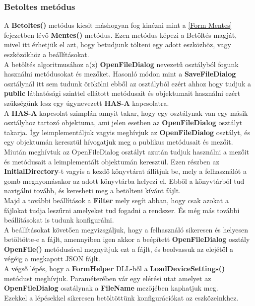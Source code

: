 \documentclass[tocnopagenum]{thesis-ekf}
\theoremstyle{definition}
\theoremstyle{remark}
\begin{document}
	\subsubsection{Betoltes metódus}
	A \textbf{Betoltes()} metódus kicsit máshogyan fog kinézni mint a \ref{Form Mentes} fejezetben lévő \textbf{Mentes()} metódus. Ezen metódus képezi a Betöltés magját, mivel itt érhetjük el azt, hogy betudjunk tölteni egy adott eszközhöz, vagy eszközökhöz a beállításokat. 
	\\
	A betöltés algoritmusához a(z) \textbf{OpenFileDialog} nevezetű osztályból fogunk használni metódusokat és mezőket. Hasonló módon mint a \textbf{SaveFileDialog} osztálynál itt sem tudunk örökölni ebből az osztályból ezért ahhoz hogy tudjuk a \textbf{public} láthatósági szinttel ellátott metódusait és objektumait használni ezért szükségünk lesz egy úgynevezett \textbf{HAS-A} kapcsolatra.
	\\
	A \textbf{HAS-A} kapcsolat szimplán annyit takar, hogy egy osztálynak van egy másik osztályhoz tartozó objektuma, ami jelen esetben az \textbf{OpenFileDialog} osztályt takarja. Így leimplementáljuk vagyis meghívjuk az \textbf{OpenFileDialog} osztályt, és egy objektumán keresztül hívogatjuk meg a publikus metódusait és mezőit.
	\\
	Miután meghívtuk az OpenFileDialog osztályt azután tudjuk használni a mezőit és metódusait a leimplementált objektumán keresztül.
	Ezen részben az \textbf{InitialDirectory}-t vagyis a kezdő könyvtárat állítjuk be, mely a felhasználót a gomb megnyomásakor az adott könyvtárba helyezi el. Ebből a könyvtárból tud navigálni tovább, és keresheti meg a betölteni kívánt fájlt. 
	\\
	Majd a további beállítások a \textbf{Filter} mely segít abban, hogy csak azokat a fájlokat tudja leszűrni amelyeket tud fogadni a rendszer.
	És még más további beállításokat is tudunk konfigurálni.
	\\
	A beállításokat követően megvizsgáljuk, hogy a felhasználó sikeresen és helyesen betöltötte-e a fájlt, amennyiben igen akkor a beépített \textbf{OpenFileDialog} osztály \textbf{OpenFile()} metódusával megnyitjuk ezt a fájlt, és beolvassuk az elejétől a végéig a megkapott JSON fájlt.
	\\
	A végső lépés, hogy a \textbf{FormHelper} DLL-ből a \textbf{LoadDeviceSettings()} metódust meghívjuk. Paraméterében vár egy elérési utat amelyet az \textbf{OpenFileDialog} osztálynak a \textbf{FileName} mezőjében kaphatjuk meg.
	\\
	Ezekkel a lépésekkel sikeresen betöltöttünk konfigurációkat az eszközeinkhez.
\end{document}
